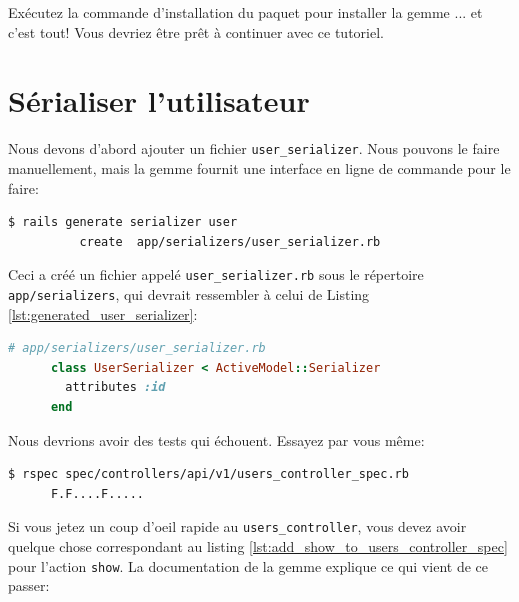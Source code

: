 \documentclass[]{report}
\begin{document}
    Exécutez la commande d'installation du paquet pour installer la gemme ... et c'est tout! Vous devriez être prêt à continuer avec ce tutoriel.

  \section{Sérialiser l'utilisateur}\label{sec:serialize_user}

    Nous devons d'abord ajouter un fichier \verb|user_serializer|. Nous pouvons le faire manuellement, mais la gemme fournit une interface en ligne de commande pour le faire:

    \begin{scriptsize}
      \begin{lstlisting}[language=bash]
      $ rails generate serializer user
          create  app/serializers/user_serializer.rb
      \end{lstlisting}
    \end{scriptsize}

    Ceci a créé un fichier appelé \verb|user_serializer.rb| sous le répertoire \verb|app/serializers|, qui devrait ressembler à celui de Listing \ref{lst:generated_user_serializer}:

    \begin{scriptsize}
      \begin{lstlisting}[language=ruby, caption={Sérialsateur d'utilisateurs généré}, label={lst:generated_user_serializer}]
      # app/serializers/user_serializer.rb
      class UserSerializer < ActiveModel::Serializer
        attributes :id
      end
      \end{lstlisting}
    \end{scriptsize}

    Nous devrions avoir des tests qui échouent. Essayez par vous même:

    \begin{scriptsize}
      \begin{lstlisting}[language=bash]
      $ rspec spec/controllers/api/v1/users_controller_spec.rb
      F.F....F.....
      \end{lstlisting}
    \end{scriptsize}

    Si vous jetez un coup d'oeil rapide au \verb|users_controller|, vous devez avoir quelque chose correspondant au listing \ref{lst:add_show_to_users_controller_spec} pour l'action \verb|show|. La documentation de la gemme explique ce qui vient de ce passer:
\end{document}
